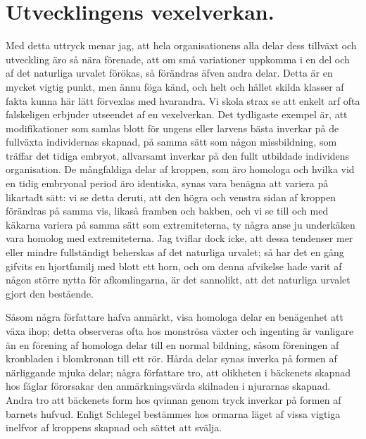 \section{Utvecklingens vexelverkan.}

Med detta uttryck menar jag, att hela organisationens alla delar dess tillväxt och utveckling äro så nära förenade, att om små variationer uppkomma i en del och af det naturliga urvalet förökas, så förändras äfven andra delar. Detta är en mycket vigtig punkt, men ännu föga känd, och helt och hållet skilda klasser af fakta kunna här lätt förvexlas med hvarandra. Vi skola strax se att enkelt arf ofta falskeligen erbjuder utseendet af en vexelverkan. Det tydligaste exempel är, att modifikationer som samlas blott för ungens eller larvens bästa inverkar på de fullväxta individernas skapnad, på samma sätt som någon missbildning, som träffar det tidiga embryot, allvarsamt inverkar på den fullt utbildade individens organisation. De mångfaldiga delar af kroppen, som äro homologa och hvilka vid en tidig embryonal period äro identiska, synas vara benägna att variera på likartadt sätt: vi se detta deruti, att den högra och venstra sidan af kroppen förändras på samma vis, likaså framben och bakben, och vi se till och med käkarna variera på samma sätt som extremiteterna, ty några anse ju underkäken vara homolog med extremiteterna. Jag tviflar dock icke, att dessa tendenser mer eller mindre fullständigt beherskas af det naturliga urvalet; så har det en gång gifvits en hjortfamilj med blott ett horn, och om denna afvikelse hade varit af någon större nytta för afkomlingarna, är det sannolikt, att det naturliga urvalet gjort den bestående.

Såsom några författare hafva anmärkt, visa homologa delar en benägenhet att växa ihop; detta observeras ofta hos monströsa växter och ingenting är vanligare än en förening af homologa delar till en normal bildning, såsom föreningen af kronbladen i blomkronan till ett rör. Hårda delar synas inverka på formen af närliggande mjuka delar; några författare tro, att olikheten i bäckenets skapnad hos fåglar förorsakar den anmärkningsvärda skilnaden i njurarnas skapnad. Andra tro att bäckenets form hos qvinnan genom tryck inverkar på formen af barnets hufvud. Enligt Schlegel bestämmes hos ormarna läget af vissa vigtiga inelfvor af kroppens skapnad och sättet att svälja.

